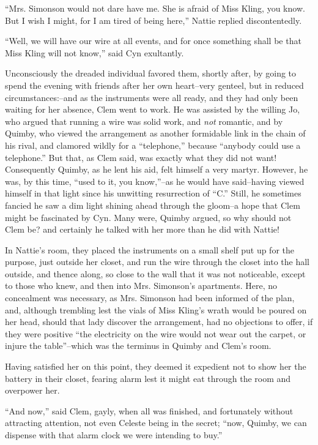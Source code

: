 ``Mrs. Simonson would not dare have me. She is afraid of Miss Kling, you
know. But I wish I might, for I am tired of being here,'' Nattie replied
discontentedly.

``Well, we will have our wire at all events, and for once something shall
be that Miss Kling will not know,'' said Cyn exultantly.

Unconsciously the dreaded individual favored them, shortly after, by
going to spend the evening with friends after her own heart--very
genteel, but in reduced circumstances:--and as the instruments were all
ready, and they had only been waiting for her absence, Clem went to
work. He was assisted by the willing Jo, who argued that running a wire
was solid work, and \emph{not} romantic, and by Quimby, who viewed the
arrangement as another formidable link in the chain of his rival, and
clamored wildly for a ``telephone,'' because ``anybody could use a
telephone.'' But that, as Clem said, was exactly what they did not want!
Consequently Quimby, as he lent his aid, felt himself a very martyr.
However, he was, by this time, ``used to it, you know,''--as he would have
said--having viewed himself in that light since his unwitting
resurrection of ``C.'' Still, he sometimes fancied he saw a dim light
shining ahead through the gloom--a hope that Clem might be fascinated by
Cyn. Many were, Quimby argued, so why should not Clem be? and certainly
he talked with her more than he did with Nattie!

In Nattie's room, they placed the instruments on a small shelf put up
for the purpose, just outside her closet, and run the wire through the
closet into the hall outside, and thence along, so close to the wall
that it was not noticeable, except to those who knew, and then into Mrs.
Simonson's apartments. Here, no concealment was necessary, as Mrs.
Simonson had been informed of the plan, and, although trembling lest the
vials of Miss Kling's wrath would be poured on her head, should that
lady discover the arrangement, had no objections to offer, if they were
positive ``the electricity on the wire would not wear out the carpet, or
injure the table''--which was the terminus in Quimby and Clem's room.

Having satisfied her on this point, they deemed it expedient not to show
her the battery in their closet, fearing alarm lest it might eat through
the room and overpower her.

``And now,'' said Clem, gayly, when all was finished, and fortunately
without attracting attention, not even Celeste being in the secret;
``now, Quimby, we can dispense with that alarm clock we were intending to
buy.''

